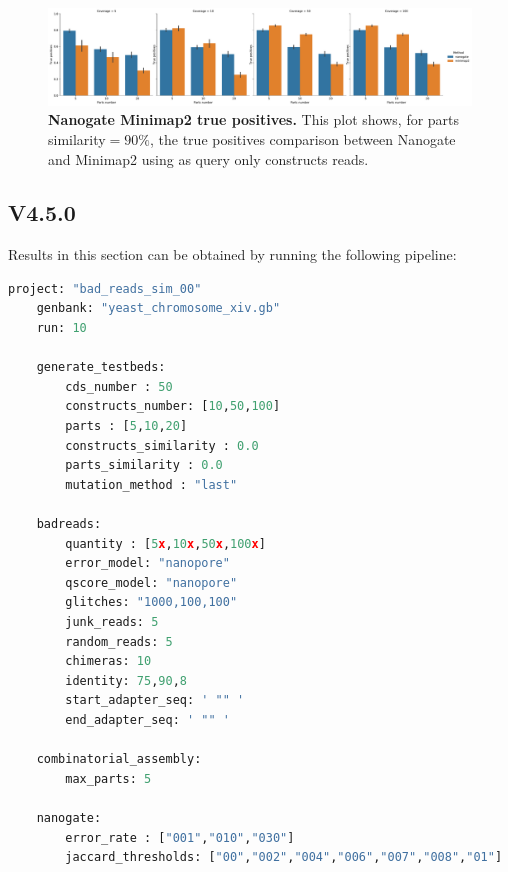 \documentclass[11pt, a4paper]{article}
\begin{document}
  \begin{figure}[ht]
    \begin{center}
    \includegraphics[width=1.35\textwidth]{../results/images_notebook/v_400/sim_09_minimap2_nanogate_true_positives_comparison.pdf}
    \end{center}
    \caption{{\bf Nanogate Minimap2 true positives.}  This plot shows, for parts similarity$=90\%$, the true positives comparison between Nanogate and Minimap2 using as query only constructs reads.}
   \label{fig:v_400_sim_90_true_positives_comparison}
\end{figure}

\clearpage
\subsection{V4.5.0 }
Results in this section can be obtained by running the following pipeline:
\begin{lstlisting}[language=Python]
    project: "bad_reads_sim_00"
    genbank: "yeast_chromosome_xiv.gb"
    run: 10
    
    generate_testbeds:
        cds_number : 50
        constructs_number: [10,50,100]
        parts : [5,10,20]
        constructs_similarity : 0.0
        parts_similarity : 0.0
        mutation_method : "last"
    
    badreads:
        quantity : [5x,10x,50x,100x]
        error_model: "nanopore"
        qscore_model: "nanopore"
        glitches: "1000,100,100"
        junk_reads: 5
        random_reads: 5
        chimeras: 10
        identity: 75,90,8
        start_adapter_seq: ' "" '
        end_adapter_seq: ' "" '
    
    combinatorial_assembly:
        max_parts: 5
    
    nanogate:
        error_rate : ["001","010","030"]
        jaccard_thresholds: ["00","002","004","006","007","008","01"]

\end{lstlisting}
\end{document}
